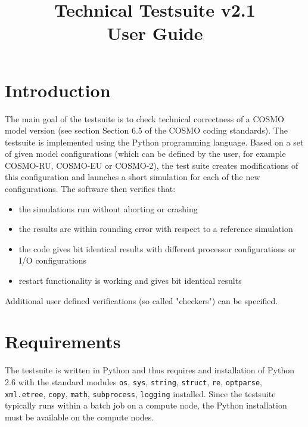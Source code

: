 \documentclass[12pt,twoside,a4paper]{report}
\title{Technical Testsuite v2.1\\User Guide}
\begin{document}
\maketitle
\setcounter{tocdepth}{1}
\tableofcontents 

\section{Introduction}

The main goal of the testsuite is to check technical correctness of a COSMO model version (see section Section 6.5 of the COSMO coding standards). The testsuite is implemented using the Python programming language.
Based on a set of given model configurations (which can be defined by the user, for example COSMO-RU, COSMO-EU or COSMO-2), the test suite creates modifications of this configuration and launches a short simulation for each of the new configurations. The software then verifies that:
\begin{itemize}
\item the simulations run without aborting or crashing
\item the results are within rounding error with respect to a reference simulation
\item the code gives bit identical results with different processor configurations or I/O configurations
\item restart functionality is working and gives bit identical results
\end{itemize}

Additional user defined verifications (so called "checkers") can be specified.

\section{Requirements}

The testsuite is written in Python and thus requires and installation of Python 2.6 with the standard modules \texttt{os}, \texttt{sys}, \texttt{string}, \texttt{struct}, \texttt{re}, \texttt{optparse}, \texttt{xml.etree}, \texttt{copy}, \texttt{math}, \texttt{subprocess}, \texttt{logging} installed. Since the testsuite typically runs within a batch job on a compute node, the Python installation must be available on the compute nodes.

\end{document}
